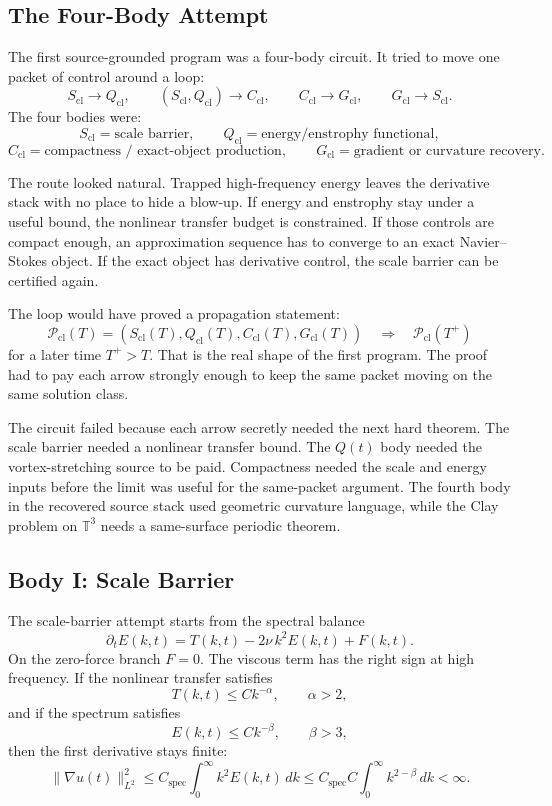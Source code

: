 \subsection{The Four-Body Attempt}

The first source-grounded program was a four-body circuit.
It tried to move one packet of control around a loop:
\[
  S_{\mathrm{cl}}\longrightarrow Q_{\mathrm{cl}},
  \qquad
  (S_{\mathrm{cl}},Q_{\mathrm{cl}})\longrightarrow C_{\mathrm{cl}},
  \qquad
  C_{\mathrm{cl}}\longrightarrow G_{\mathrm{cl}},
  \qquad
  G_{\mathrm{cl}}\longrightarrow S_{\mathrm{cl}} .
\]
The four bodies were:
\[
  S_{\mathrm{cl}}
  =
  \text{scale barrier},
  \qquad
  Q_{\mathrm{cl}}
  =
  \text{energy/enstrophy functional},
\]
\[
  C_{\mathrm{cl}}
  =
  \text{compactness / exact-object production},
  \qquad
  G_{\mathrm{cl}}
  =
  \text{gradient or curvature recovery}.
\]

The route looked natural.
Trapped high-frequency energy leaves the derivative stack with no place to
hide a blow-up.
If energy and enstrophy stay under a useful bound, the nonlinear transfer budget
is constrained.
If those controls are compact enough, an approximation sequence has to converge
to an exact Navier--Stokes object.
If the exact object has derivative control, the scale barrier can be certified
again.

The loop would have proved a propagation statement:
\[
  \mathcal P_{\mathrm{cl}}(T)
  =
  (S_{\mathrm{cl}}(T),Q_{\mathrm{cl}}(T),C_{\mathrm{cl}}(T),G_{\mathrm{cl}}(T))
  \quad\Longrightarrow\quad
  \mathcal P_{\mathrm{cl}}(T^+)
\]
for a later time \(T^+>T\).
That is the real shape of the first program.
The proof had to pay each arrow strongly enough to keep the same packet moving
on the same solution class.

The circuit failed because each arrow secretly needed the next hard theorem.
The scale barrier needed a nonlinear transfer bound.
The \(Q(t)\) body needed the vortex-stretching source to be paid.
Compactness needed the scale and energy inputs before the limit was useful for
the same-packet argument.
The fourth body in the recovered source stack used geometric curvature language,
while the Clay problem on \(\mathbb T^3\) needs a same-surface periodic theorem.

\subsection{Body I: Scale Barrier}

The scale-barrier attempt starts from the spectral balance
\[
  \partial_t E(k,t)=T(k,t)-2\nu\,k^2E(k,t)+F(k,t).
\]
On the zero-force branch \(F=0\).
The viscous term has the right sign at high frequency.
If the nonlinear transfer satisfies
\[
  T(k,t)\le Ck^{-\alpha},\qquad \alpha>2,
\]
and if the spectrum satisfies
\[
  E(k,t)\le Ck^{-\beta},\qquad \beta>3,
\]
then the first derivative stays finite:
\[
  \|\nabla u(t)\|_{L^2}^2
  \le
  C_{\mathrm{spec}}\int_0^\infty k^2E(k,t)\,dk
  \le
  C_{\mathrm{spec}}C\int_0^\infty k^{2-\beta}\,dk
  <\infty .
\]


